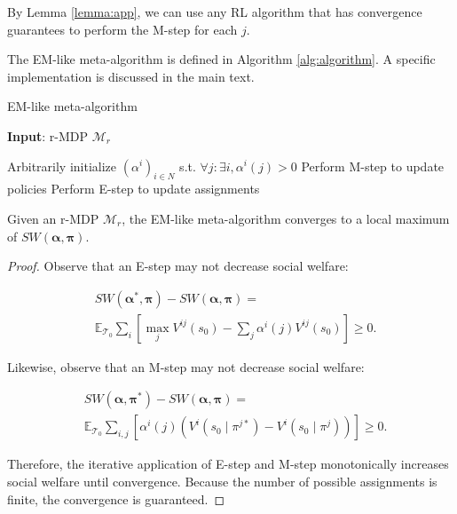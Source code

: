 By Lemma \ref{lemma:app}, we can use any RL algorithm that has convergence guarantees to perform the M-step for each $j$.


The EM-like meta-algorithm is defined in Algorithm \ref{alg:algorithm}. A specific implementation is discussed in the main text.

\begin{algorithm}[tb]
    \caption{EM-like meta-algorithm}
    \label{alg:algorithm}
    \textbf{Input}: r-MDP $\mathcal{M}_r$
    \begin{algorithmic}[1] %
        \STATE Arbitrarily initialize $(\alpha^i)_{i \in N}$ s.t. $\forall j: \exists i, \alpha^i(j) > 0$
            \STATE Perform M-step to update policies
            \STATE Perform E-step to update assignments
        \ENDWHILE
    \end{algorithmic}
\end{algorithm}



\begin{theorem}\label{theorem:app}
    Given an r-MDP $\mathcal{M}_r$, the EM-like meta-algorithm converges to a local maximum of $SW(\boldsymbol\alpha, \boldsymbol\pi).$ 
\end{theorem}

\begin{proof}
    Observe that an E-step may not decrease social welfare:

    \begin{equation*}
    \begin{split}
        & SW(\boldsymbol\alpha^*, \boldsymbol\pi) - SW(\boldsymbol\alpha, \boldsymbol\pi) =\\
        & \mathbb{E}_{\mathcal{T}_0} \sum_i \left[ \max_j V^{ij}(s_0) - \sum_j \alpha^i(j) V^{ij}(s_0) \right] \geq 0.
    \end{split}
    \end{equation*}

    Likewise, observe that an M-step may not decrease social welfare:

    \begin{equation*}
    \begin{split}
        & SW(\boldsymbol\alpha, \boldsymbol\pi^*) - SW(\boldsymbol\alpha, \boldsymbol\pi) =\\
        & \mathbb{E}_{\mathcal{T}_0} \sum_{i, j} \left[ \alpha^i(j) \left( V^i(s_0 \mid \pi^{j*}) - V^i(s_0 \mid \pi^j) \right) \right] \geq 0.
    \end{split}
    \end{equation*}

    Therefore, the iterative application of E-step and M-step monotonically increases social welfare until convergence. Because the number of possible assignments is finite, the convergence is guaranteed.
\end{proof}


